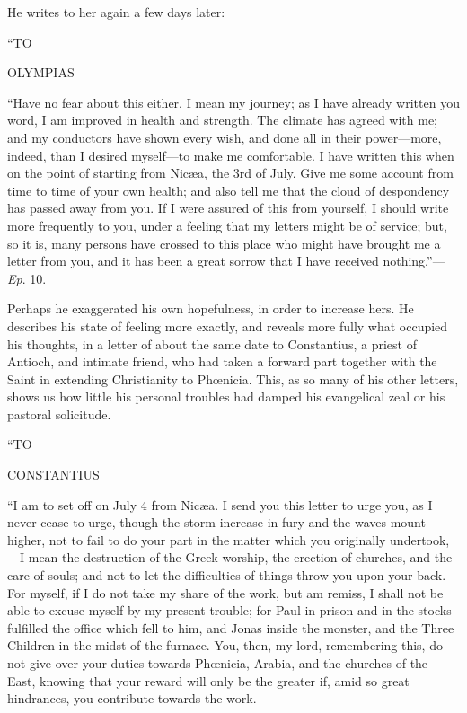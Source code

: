 He writes to her again a few days later:

``TO

OLYMPIAS

``Have no fear about this either, I mean my journey; as I have
already written you word, I am improved in health and strength. The
climate has agreed with me; and my conductors have shown every wish,
and done all in their power—more, indeed, than I desired myself—to
make me comfortable. I have written this when on the point of starting
from Nicæa, the 3rd of July. Give me some account from time to time
of your own health; and also tell me that the cloud of despondency has
passed away from you. If I were assured of this from yourself, I
should write more frequently to you, under a feeling that my letters
might be of service; but, so it is, many persons have crossed to this
place who might have brought me a letter from you, and it has been a
great sorrow that I have received nothing.''—\emph{Ep}. 10.

Perhaps he exaggerated his own hopefulness, in order to increase
hers. He describes his state of feeling more exactly, and reveals more
fully what occupied his thoughts, in a letter of about the same date
to Constantius, a priest of Antioch, and intimate friend, who had
taken a forward part together with the Saint in extending Christianity
to Phœnicia. This, as so many of his other letters, shows us how
little his personal troubles had damped his evangelical zeal or his
pastoral solicitude.

``TO

CONSTANTIUS

``I am to set off on July 4 from Nicæa. I send you this letter
to urge you, as I never cease to urge, though the storm increase in
fury and the waves mount higher, not to fail to do your part in the
matter which you originally undertook,—I mean the destruction
of the Greek worship, the erection of churches,
and the care of souls; and not to let the difficulties of things throw
you upon your back. For myself, if I do not take my share of the work,
but am remiss, I shall not be able to excuse myself by my present
trouble; for Paul in prison and in the stocks fulfilled the office
which fell to him, and Jonas inside the monster, and the Three
Children in the midst of the furnace. You, then, my lord, remembering
this, do not give over your duties towards Phœnicia, Arabia, and the
churches of the East, knowing that your reward will only be the
greater if, amid so great hindrances, you contribute towards the work.

